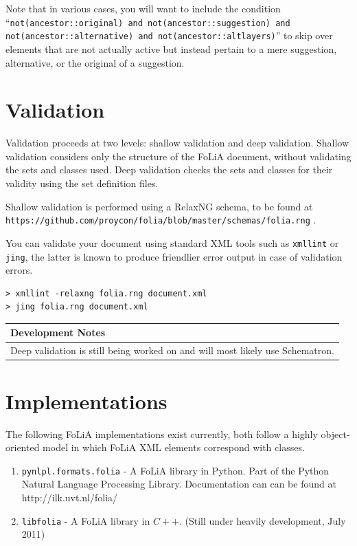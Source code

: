 \documentclass[a4paper,12pt]{report}
\newenvironment{devnotes}
{
\begin{center}
    \begin{tabular}[h!]{|p{0.8\textwidth}|}
    \hline
    {\bf Development Notes}\\\hline}
{   \\\hline
    \end{tabular}
\end{center}}
\begin{document}
Note that in various cases, you will want to include the condition ``\texttt{not(ancestor::original) and not(ancestor::suggestion) and not(ancestor::alternative) and not(ancestor::altlayers)}'' to skip over elements that are not actually active but instead pertain to a mere suggestion, alternative, or the original of a suggestion.

\chapter{Validation}

Validation proceeds at two levels: shallow validation and deep validation. Shallow validation considers only the structure of the FoLiA document, without validating the sets and classes used. Deep validation checks the sets and classes for their validity using the set definition files.

Shallow validation is performed using a RelaxNG schema, to be found at \texttt{https://github.com/proycon/folia/blob/master/schemas/folia.rng} .

You can validate your document using standard XML tools such as \texttt{xmllint} or \texttt{jing}, the latter is known to produce friendlier error output in case of validation errors.

\begin{lstlisting}
> xmllint -relaxng folia.rng document.xml
> jing folia.rng document.xml
\end{lstlisting}


\begin{devnotes}
Deep validation is still being worked on and will most likely use Schematron.
\end{devnotes}

\chapter{Implementations}

The following FoLiA implementations exist currently, both follow a highly object-oriented model in which FoLiA XML elements correspond with classes.

\begin{enumerate}
\item \texttt{pynlpl.formats.folia} - A FoLiA library in Python. Part of the Python Natural Language Processing Library. Documentation can can be found at http://ilk.uvt.nl/folia/
\item \texttt{libfolia} - A FoLiA library in $C++$. (Still under heavily development, July 2011)
\end{enumerate}
\end{document}
